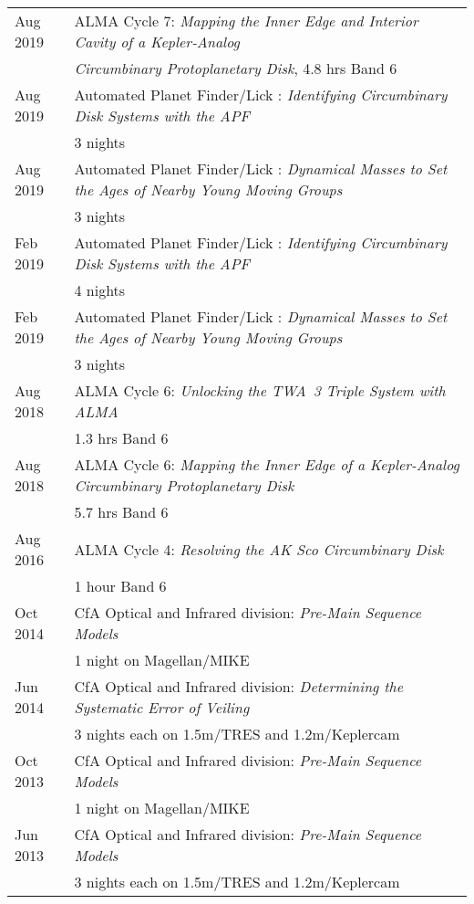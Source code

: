 \documentclass[10pt]{article}
\begin{document}
\begin{tabular*}{\textwidth}{@{\hspace{10pt}}p{1.2in}l}
  Aug 2019 & ALMA Cycle 7: \emph{Mapping the Inner Edge and Interior Cavity of a Kepler-Analog}\\
  & \emph{Circumbinary Protoplanetary Disk}, 4.8 hrs Band 6\\
  Aug 2019 & Automated Planet Finder/Lick : \emph{Identifying Circumbinary Disk Systems with the APF} \\
  & 3 nights \\
  Aug 2019 & Automated Planet Finder/Lick : \emph{Dynamical Masses to Set the Ages of Nearby Young Moving Groups} \\
  & 3 nights \\
  Feb 2019 & Automated Planet Finder/Lick : \emph{Identifying Circumbinary Disk Systems with the APF} \\
  & 4 nights \\
  Feb 2019 & Automated Planet Finder/Lick : \emph{Dynamical Masses to Set the Ages of Nearby Young Moving Groups} \\
  & 3 nights \\
  Aug 2018 & ALMA Cycle 6: \emph{Unlocking the TWA~3 Triple System with ALMA}\\
  & 1.3 hrs Band 6\\
  Aug 2018 & ALMA Cycle 6: \emph{Mapping the Inner Edge of a Kepler-Analog Circumbinary Protoplanetary Disk}\\
  & 5.7 hrs Band 6\\
  Aug 2016 & ALMA Cycle 4: \emph{Resolving the AK Sco Circumbinary Disk}\\
  & 1 hour Band 6\\
  Oct 2014 & CfA Optical and Infrared division: \emph{Pre-Main Sequence Models}\\
  & 1 night on Magellan/MIKE\\
  Jun 2014 & CfA Optical and Infrared division: \emph{Determining the Systematic Error of Veiling}\\
  & 3 nights each on 1.5m/TRES and 1.2m/Keplercam\\
  Oct 2013 & CfA Optical and Infrared division: \emph{Pre-Main Sequence Models} \\
  & 1 night on Magellan/MIKE\\
  Jun 2013 & CfA Optical and Infrared division: \emph{Pre-Main Sequence Models}\\
  &  3 nights each on 1.5m/TRES and 1.2m/Keplercam\\
\end{tabular*}
\end{document}

